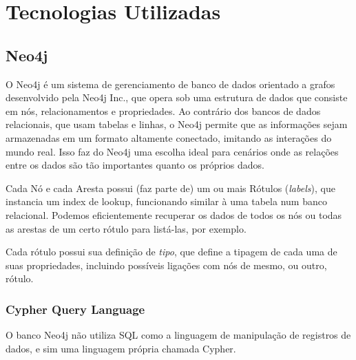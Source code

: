 \chapter{Tecnologias Utilizadas}
\label{chap3}

\section{Neo4j}
O Neo4j é um sistema de gerenciamento de banco de dados orientado a grafos desenvolvido pela Neo4j Inc., que opera sob uma estrutura de dados que consiste em nós, relacionamentos e propriedades. Ao contrário dos bancos de dados relacionais, que usam tabelas e linhas, o Neo4j permite que as informações sejam armazenadas em um formato altamente conectado, imitando as interações do mundo real. Isso faz do Neo4j uma escolha ideal para cenários onde as relações entre os dados são tão importantes quanto os próprios dados.

 
Cada Nó e cada Aresta possui (faz parte de) um ou mais Rótulos (\textit{labels}), que instancia um index de lookup, funcionando similar à uma tabela num banco relacional. Podemos eficientemente recuperar os dados de todos os nós ou todas as arestas de um certo rótulo para listá-las, por exemplo.

Cada rótulo possui sua definição de \textit{tipo}, que define a tipagem de cada uma de suas propriedades, incluindo possíveis ligações com nós de mesmo, ou outro, rótulo.

\subsection{Cypher Query Language}
O banco Neo4j não utiliza SQL como a linguagem de manipulação de registros de dados, e sim uma linguagem própria chamada Cypher.

